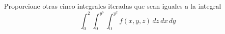 \item Proporcione otras cinco integrales iteradas que sean iguales a la integral
\[ \int_0^2 \int_0^{y^3} \int_0^{y^2} f(x, y, z) \, dz \, dx \, dy \]
